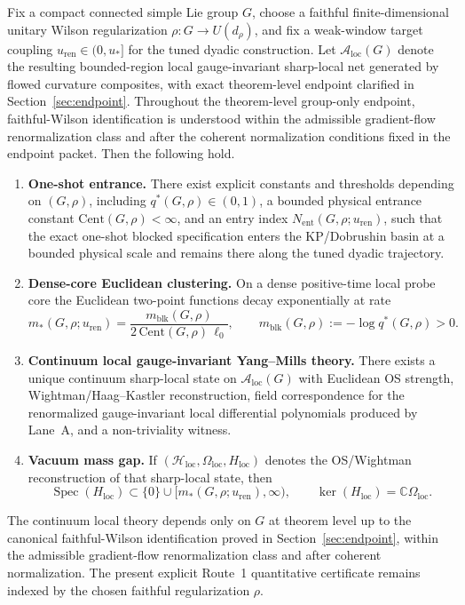 \begin{theorem}\label{thm:main}
Fix a compact connected simple Lie group $G$, choose a faithful finite-dimensional unitary Wilson regularization $\rho:G\to U(d_\rho)$, and fix a weak-window target coupling $u_{\mathrm{ren}}\in(0,u_*]$ for the tuned dyadic construction. Let $\mathcal A_{\mathrm{loc}}(G)$ denote the resulting bounded-region local gauge-invariant sharp-local net generated by flowed curvature composites, with exact theorem-level endpoint clarified in Section~\ref{sec:endpoint}. Throughout the theorem-level group-only endpoint, faithful-Wilson identification is understood within the admissible gradient-flow renormalization class and after the coherent normalization conditions fixed in the endpoint packet. Then the following hold.
\begin{enumerate}[label=\textup{(\Alph*)}]
    \item \textbf{One-shot entrance.} There exist explicit constants and thresholds depending on $(G,\rho)$, including $q^*(G,\rho)\in(0,1)$, a bounded physical entrance constant $\mathrm{Cent}(G,\rho)<\infty$, and an entry index $N_{\mathrm{ent}}(G,\rho;u_{\mathrm{ren}})$, such that the exact one-shot blocked specification enters the KP/Dobrushin basin at a bounded physical scale and remains there along the tuned dyadic trajectory.
    \item \textbf{Dense-core Euclidean clustering.} On a dense positive-time local probe core the Euclidean two-point functions decay exponentially at rate
    \[
      m_*(G,\rho;u_{\mathrm{ren}})=\frac{m_{\mathrm{blk}}(G,\rho)}{2\,\mathrm{Cent}(G,\rho)\,\ell_0},\qquad m_{\mathrm{blk}}(G,\rho):=-\log q^*(G,\rho)>0.
    \]
    \item \textbf{Continuum local gauge-invariant Yang--Mills theory.} There exists a unique continuum sharp-local state on $\mathcal A_{\mathrm{loc}}(G)$ with Euclidean OS strength, Wightman/Haag--Kastler reconstruction, field correspondence for the renormalized gauge-invariant local differential polynomials produced by Lane~A, and a non-triviality witness.
    \item \textbf{Vacuum mass gap.} If $(\mathcal H_{\mathrm{loc}},\Omega_{\mathrm{loc}},H_{\mathrm{loc}})$ denotes the OS/Wightman reconstruction of that sharp-local state, then
    \[
      \operatorname{Spec}(H_{\mathrm{loc}})\subset \{0\}\cup [m_*(G,\rho;u_{\mathrm{ren}}),\infty),\qquad \ker(H_{\mathrm{loc}})=\mathbb C\Omega_{\mathrm{loc}}.
    \]
\end{enumerate}
The continuum local theory depends only on $G$ at theorem level up to the canonical faithful-Wilson identification proved in Section~\ref{sec:endpoint}, within the admissible gradient-flow renormalization class and after coherent normalization. The present explicit Route~1 quantitative certificate remains indexed by the chosen faithful regularization $\rho$.
\end{theorem}
